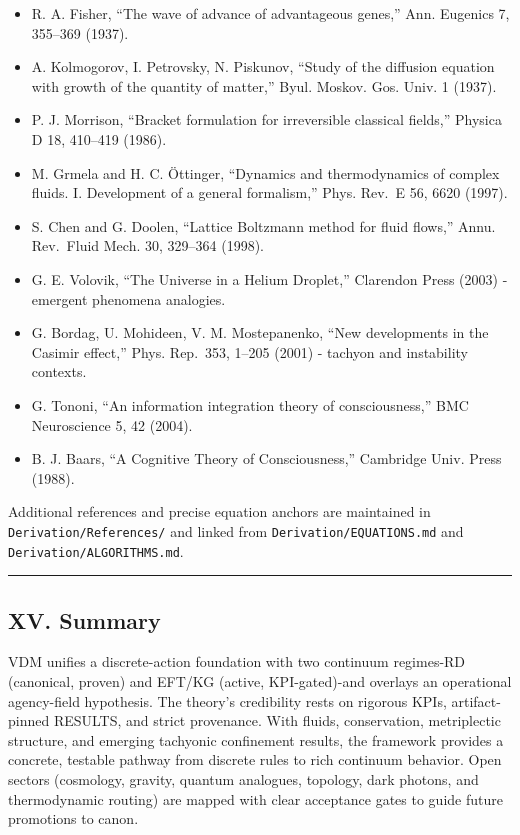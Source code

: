 \documentclass[
]{article}
\providecommand{\tightlist}{%
  \setlength{\itemsep}{0pt}\setlength{\parskip}{0pt}}
\begin{document}
\begin{itemize}
\tightlist
\item
  R. A. Fisher, ``The wave of advance of advantageous genes,'' Ann.
  Eugenics 7, 355--369 (1937).
\item
  A. Kolmogorov, I. Petrovsky, N. Piskunov, ``Study of the diffusion
  equation with growth of the quantity of matter,'' Byul. Moskov. Gos.
  Univ. 1 (1937).
\item
  P. J. Morrison, ``Bracket formulation for irreversible classical
  fields,'' Physica D 18, 410--419 (1986).
\item
  M. Grmela and H. C. \"{O}ttinger, ``Dynamics and thermodynamics of complex
  fluids. I. Development of a general formalism,'' Phys. Rev.~E 56, 6620
  (1997).
\item
  S. Chen and G. Doolen, ``Lattice Boltzmann method for fluid flows,''
  Annu. Rev.~Fluid Mech. 30, 329--364 (1998).
\item
  G. E. Volovik, ``The Universe in a Helium Droplet,'' Clarendon Press
  (2003) - emergent phenomena analogies.
\item
  G. Bordag, U. Mohideen, V. M. Mostepanenko, ``New developments in the
  Casimir effect,'' Phys. Rep.~353, 1--205 (2001) - tachyon and
  instability contexts.
\item
  G. Tononi, ``An information integration theory of consciousness,'' BMC
  Neuroscience 5, 42 (2004).
\item
  B. J. Baars, ``A Cognitive Theory of Consciousness,'' Cambridge Univ.
  Press (1988).
\end{itemize}

Additional references and precise equation anchors are maintained in
\texttt{Derivation/References/} and linked from
\texttt{Derivation/EQUATIONS.md} and \texttt{Derivation/ALGORITHMS.md}.

\begin{center}\rule{0.5\linewidth}{0.5pt}\end{center}

\hypertarget{xv.-summary}{%
\subsection{XV. Summary}\label{xv.-summary}}

VDM unifies a discrete-action foundation with two continuum regimes-RD
(canonical, proven) and EFT/KG (active, KPI-gated)-and overlays an
operational agency-field hypothesis. The theory's credibility rests on
rigorous KPIs, artifact-pinned RESULTS, and strict provenance. With
fluids, conservation, metriplectic structure, and emerging tachyonic
confinement results, the framework provides a concrete, testable pathway
from discrete rules to rich continuum behavior. Open sectors (cosmology,
gravity, quantum analogues, topology, dark photons, and thermodynamic
routing) are mapped with clear acceptance gates to guide future
promotions to canon.
\end{document}
